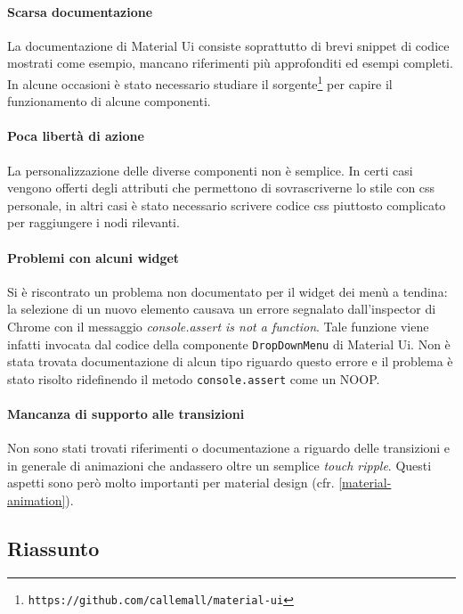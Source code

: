 \paragraph{Scarsa documentazione}
La documentazione di Material Ui consiste soprattutto
di brevi snippet di codice mostrati come esempio, mancano riferimenti più approfonditi ed
esempi completi. In alcune occasioni è stato necessario studiare il sorgente\footnote{\texttt{https://github.com/callemall/material-ui}} per capire il
funzionamento di alcune componenti.

\paragraph{Poca libertà di azione}
La personalizzazione delle diverse componenti non è
semplice. In certi casi vengono offerti degli attributi che permettono di sovrascriverne
lo stile con css personale, in altri casi è stato necessario scrivere codice css piuttosto
complicato per raggiungere i nodi rilevanti.

\paragraph{Problemi con alcuni widget}
Si è riscontrato un problema non documentato
per il widget dei menù a tendina: la selezione di un nuovo elemento causava un errore
segnalato dall'inspector di Chrome con il messaggio \textit{console.assert
is not a function}. Tale funzione viene infatti invocata dal codice della componente
\texttt{DropDownMenu} di Material Ui. Non è stata trovata documentazione di alcun tipo
riguardo questo errore e il problema è stato risolto ridefinendo il metodo
\texttt{console.assert} come un NOOP.

\paragraph{Mancanza di supporto alle transizioni}
Non sono stati trovati riferimenti
o documentazione a riguardo delle transizioni e in generale di animazioni che andassero
oltre un semplice \textit{touch ripple}. Questi aspetti sono però molto importanti per
material design (cfr. \ref{material-animation}).

\subsection{Riassunto}

